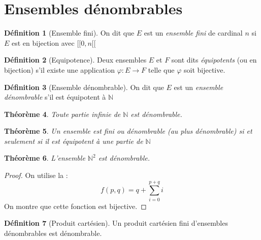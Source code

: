 \documentclass[11pt,a4paper]{report}
\newtheorem{theorem}{Théorème}[chapter]
\newtheorem{itheorem}[theorem]{Théorème}
\theoremstyle{definition}
\newtheorem{dfn}[theorem]{Définition}
\begin{document}
\section{Ensembles dénombrables} %
\label{sec:denombrement}
\begin{dfn}[Ensemble fini]
     On dit que $E$ est un \emph{ensemble fini} de cardinal $n$ si $E$ est en bijection avec $[\![ 0 , n [\![$
\end{dfn}
\begin{dfn}[Equipotence]
     Deux ensembles $E$ et $F$ sont dits \emph{équipotents} (ou en bijection) s'il existe une application $\varphi : E \to F$ telle que $\varphi$ soit bijective.
\end{dfn}
\begin{dfn}[Ensemble dénombrable]
     On dit que $E$ est un \emph{ensemble dénombrable} s'il est équipotent à $\mathbb{N}$
\end{dfn}
\begin{theorem}
     Toute partie \emph{infinie} de $\mathbb{N}$ est dénombrable.
\end{theorem}
\begin{theorem}
     Un ensemble est fini ou dénombrable (\emph{au plus dénombrable}) \emph{si et seulement si} il est équipotent à une partie de $\mathbb{N}$
\end{theorem}
\begin{itheorem}
     L'ensemble $\mathbb{N}^2$ est dénombrable.
\end{itheorem}
\begin{proof}
     On utilise la  : 
     \begin{equation}
     f(p,q) = q + \sum_{i=0}^{p+q} i
     \end{equation}
     On montre que cette fonction est bijective.
\end{proof}
\begin{dfn}[Produit cartésien]
     Un produit cartésien fini d'ensembles dénombrables est dénombrable.
\end{dfn}
\end{document}
